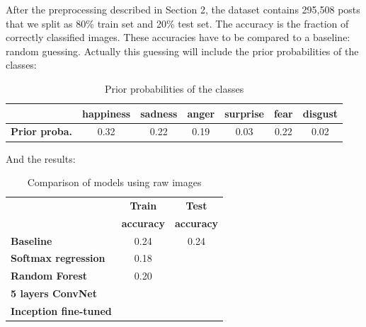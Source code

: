 After the preprocessing described in Section 2, the dataset contains 295,508 posts that we split as 80\% train set and 20\% test set. The accuracy is the fraction of correctly classified images. These accuracies have to be compared to a baseline: random guessing. Actually this guessing will include the prior probabilities of the classes: 
\begin{table}[H]
\begin{center}
    \begin{tabular}{| c | c | c | c | c | c | c |}
    \hline
     & \textbf{happiness} & \textbf{sadness} &  \textbf{anger} & \textbf{surprise} & \textbf{fear} & \textbf{disgust} \\ \hline
    \textbf{Prior proba.} & 0.32 & 0.22 & 0.19 & 0.03 & 0.22 & 0.02 \\
    \hline
    \end{tabular}
\end{center} 
\caption{Prior probabilities of the classes}
\end{table}

And the results:
\begin{table}[H]
\begin{center}
    \begin{tabular}{| l | c | c |}
    \hline
    & \textbf{Train} & \textbf{Test} \\
    & \textbf{accuracy} & \textbf{accuracy} \\ \hline
    \textbf{Baseline} & 0.24 & 0.24 \\ \hline
    \textbf{Softmax regression} & 0.18 & \\ \hline
    \textbf{Random Forest}  & 0.20 & \\ \hline
    \textbf{5 layers ConvNet}  &  &\\ \hline
    \textbf{Inception fine-tuned}  & & \\
    \hline
    \end{tabular}
\end{center} 
\caption{Comparison of models using raw images}
\end{table}





